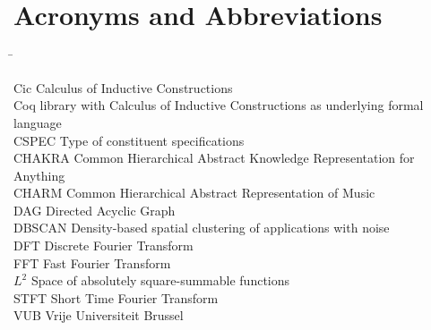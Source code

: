 \section*{Acronyms and Abbreviations}
\begin{tabbing}
 \hspace*{1.6cm}  \= \kill

    Cic \> Calculus of Inductive Constructions \\[0.5ex]
Coq \>  library with Calculus of Inductive Constructions as underlying
formal language \\[0.5ex]
 CSPEC \> Type of constituent specifications \\[0.5ex]
  CHAKRA \> Common Hierarchical Abstract Knowledge Representation for Anything \\[0.5ex]
 CHARM \> Common Hierarchical Abstract Representation of Music \\[0.5ex]
  DAG \> Directed Acyclic Graph \\[0.5ex]
 DBSCAN \> Density-based spatial clustering of applications with noise \\[0.5ex]
  DFT \> Discrete Fourier Transform \\[0.5ex]
  FFT \> Fast Fourier Transform \\[0.5ex]
  $L^2$ \> Space of absolutely square-summable functions \\[0.5ex]
  STFT \> Short Time Fourier Transform \\[0.5ex]
VUB \> Vrije Universiteit Brussel \\[0.5ex]




\end{tabbing}



